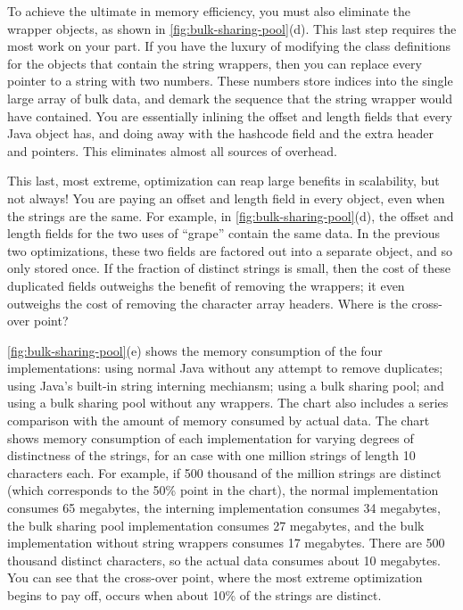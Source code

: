 To achieve the ultimate in memory efficiency, you must also eliminate the
 wrapper objects, as shown in \autoref{fig:bulk-sharing-pool}(d).
This last step requires the most work on your part. If you have the luxury of
modifying the class definitions for the objects that contain the string
wrappers, then you can replace every pointer to a string with two numbers. These
numbers store indices into the single large array of bulk data, and demark the
sequence that the string wrapper would have contained. You are essentially
inlining the offset and length fields that every Java  object has,
and doing away with the hashcode field and the extra header and pointers. This
eliminates almost all sources of overhead.

This last, most extreme, optimization can reap large benefits in scalability,
but not always! You are paying an offset and length field in every object, even
when the strings are the same. For example, in
\autoref{fig:bulk-sharing-pool}(d), the offset and length fields for the two
uses of ``grape'' contain the same data. In the previous two optimizations,
these two fields are factored out into a separate  object, and so
only stored once. If the fraction of distinct strings
is small, then the cost of these duplicated fields outweighs the benefit of
removing the wrappers; it even outweighs the cost of removing the character
array headers. Where is the cross-over point?

\autoref{fig:bulk-sharing-pool}(e) shows the memory consumption of the four
implementations: using normal Java  without any attempt to remove
duplicates; using Java's built-in string interning mechiansm; using a bulk
sharing pool; and using a bulk sharing pool without any  wrappers.
The chart also includes a series comparison with the amount of memory consumed by
actual data.  The chart shows memory consumption of each implementation for
varying degrees of distinctness of the strings, for an case with one million
strings of length 10 characters each.
For example, if 500 thousand of the million strings are distinct (which
corresponds to the 50\% point in the chart), the normal implementation consumes
65 megabytes, the interning implementation consumes 34 megabytes, the bulk
sharing pool implementation consumes 27 megabytes, and the bulk implementation
without string wrappers consumes 17 megabytes. There are 500 thousand
distinct characters, so the actual data consumes about 10 megabytes. You can see
that the cross-over point, where the most extreme optimization begins to pay
off, occurs when about 10\% of the strings are distinct.

